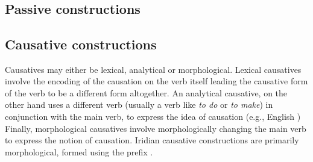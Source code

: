 \pex{}
\\
\\
\\
\\
\\
\\
\xe



\subsection{Passive constructions}


\subsection{Causative constructions}

Causatives may either be lexical, analytical or morphological. Lexical causatives involve the encoding of the causation on the verb itself leading the causative form of the verb to be a different form altogether. An analytical causative, on the other hand uses a different verb (usually a verb like \emph{to do} or \emph{to make}) in conjunction with the main verb, to express the idea of causation (e.g., English ) Finally, morphological causatives involve morphologically changing the main verb to express the notion of causation. Iridian causative constructions are primarily morphological, formed using the prefix .

